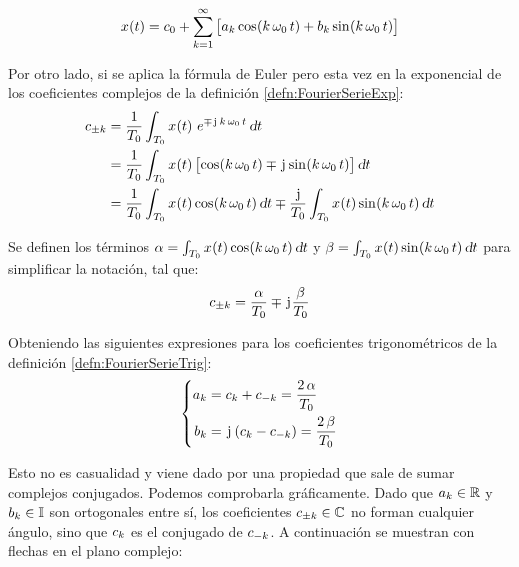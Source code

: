 \begin{mdframed}[style=DefinitionFrame]
    \begin{defn}
        \label{defn:FourierSerieTrig}
    \end{defn}
    \[
        \fx[x]{t} = c_0 + \sum_{\kth=1}^{\infty} \inBrackets{a_\kth \fx[\cos]{\kth \, \omega_0 \, t} + b_\kth \fx[\sin]{\kth \, \omega_0 \, t} }
    \]
\end{mdframed}

Por otro lado, si se aplica la fórmula de Euler pero esta vez en la exponencial de los coeficientes complejos de la definición \ref{defn:FourierSerieExp}:
\begin{align*}
    c_{\pm\kth} &= \frac{1}{T_0} \int_{T_0} \fx[x]{t} \, e^{\mp \iu \, \kth \, \omega_0 \, t} \, \dif t
    \\
    &= \frac{1}{T_0} \int_{T_0} \fx[x]{t} \inBrackets{ \fx[\cos]{\kth \, \omega_0 \, t} \mp \iu \fx[\sin]{\kth \, \omega_0 \, t} } \, \dif t
    \\
    &= \frac{1}{T_0} \int_{T_0} \fx[x]{t} \fx[\cos]{\kth \, \omega_0 \, t} \dif t
    \mp \frac{\iu}{T_0} \int_{T_0} \fx[x]{t} \fx[\sin]{\kth \, \omega_0 \, t} \dif t
\end{align*}

Se definen los términos $\alpha = \int_{T_0} \fx[x]{t} \fx[\cos]{\kth \, \omega_0 \, t} \dif t$ y $\beta = \int_{T_0} \fx[x]{t} \fx[\sin]{\kth \, \omega_0 \, t} \dif t$ para simplificar la notación, tal que:
\[
     c_{\pm\kth} = \frac{\alpha}{T_0} \mp \iu \frac{\beta}{T_0}
\]

Obteniendo las siguientes expresiones para los coeficientes trigonométricos de la definición \ref{defn:FourierSerieTrig}:
\[
    \left\{
    \begin{aligned}
        a_\kth &= c_\kth + c_{-\kth} = \frac{2 \, \alpha}{T_0}
        \\
        b_\kth &= \iu \inParentheses{c_\kth - c_{-\kth}} = \frac{2 \, \beta}{T_0}
    \end{aligned}
    \right.
\]

Esto no es casualidad y viene dado por una propiedad que sale de sumar complejos conjugados.
Podemos comprobarla gráficamente.
Dado que $a_\kth \in \setR$ y $b_\kth \in \setI$ son ortogonales entre sí, los coeficientes $c_{\pm\kth} \in \setC$ no forman cualquier ángulo, sino que $c_\kth$ es el conjugado de $c_{-\kth}$.
A continuación se muestran con flechas en el plano complejo:

